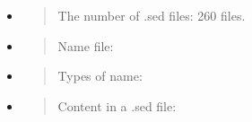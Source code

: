 \documentclass[
]{article}
\begin{document}
\begin{itemize}
\item
  \begin{quote}
  The number of .sed files: 260 files.
  \end{quote}
\end{itemize}

\begin{itemize}
\item
  \begin{quote}
  Name file:
  \end{quote}
\item
  \begin{quote}
  Types of name:
  \end{quote}
\item
  \begin{quote}
  Content in a .sed file:
  \end{quote}
\end{itemize}
\end{document}
